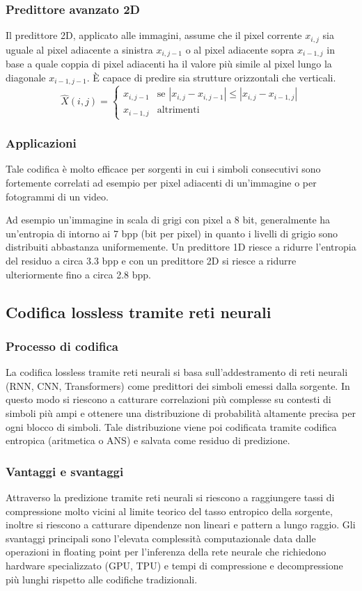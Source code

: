 \subsubsection*{Predittore avanzato 2D}
Il predittore 2D, applicato alle immagini, assume che il pixel corrente \(x_{i,j}\) sia uguale al pixel adiacente a sinistra
\(x_{i,j-1}\) o al pixel adiacente sopra \(x_{i-1,j}\) in base a quale coppia di pixel adiacenti ha il valore più simile al
pixel lungo la diagonale \(x_{i-1,j-1}\). È capace di predire sia strutture orizzontali che verticali.
\[\hat{X}(i,j) = \begin{cases}
	x_{i,j-1} & \text{se } |x_{i,j} - x_{i,j-1}| \leq |x_{i,j} - x_{i-1,j}| \\
	x_{i-1,j} & \text{altrimenti}
\end{cases}\]

\subsubsection*{Applicazioni}
Tale codifica è molto efficace per sorgenti in cui i simboli consecutivi sono fortemente correlati ad esempio per
pixel adiacenti di un'immagine o per fotogrammi di un video.

Ad esempio un'immagine in scala di grigi con pixel a 8 bit, generalmente ha un'entropia di intorno ai 7 bpp (bit per
pixel) in quanto i livelli di grigio sono distribuiti abbastanza uniformemente. Un predittore 1D riesce a ridurre
l'entropia del residuo a circa 3.3 bpp e con un predittore 2D si riesce a ridurre ulteriormente fino a  circa 2.8 bpp.

\subsection{Codifica lossless tramite reti neurali}
\subsubsection*{Processo di codifica}
La codifica lossless tramite reti neurali si basa sull'addestramento di reti neurali (RNN, CNN, Transformers) come
predittori dei simboli emessi dalla sorgente. In questo modo si riescono a catturare correlazioni più complesse su
contesti di simboli più ampi e ottenere una distribuzione di probabilità altamente precisa per ogni blocco di simboli.
Tale distribuzione viene poi codificata tramite codifica entropica (aritmetica o ANS) e salvata come residuo di predizione.

\subsubsection*{Vantaggi e svantaggi}
Attraverso la predizione tramite reti neurali si riescono a raggiungere tassi di compressione molto vicini al limite
teorico del tasso entropico della sorgente, inoltre si riescono a catturare dipendenze non lineari e pattern a lungo
raggio.
Gli svantaggi principali sono l'elevata complessità computazionale data dalle operazioni in floating point per
l'inferenza della rete neurale che richiedono hardware specializzato (GPU, TPU) e tempi di compressione e decompressione
più lunghi rispetto alle codifiche tradizionali.
